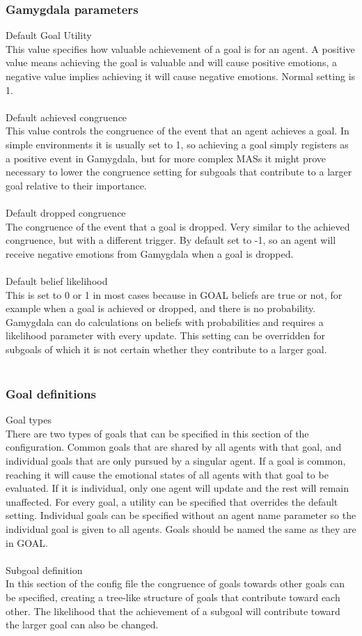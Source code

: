 \documentclass[]{article}
\begin{document}
\subsubsection{Gamygdala parameters}
Default Goal Utility\\
This value specifies how valuable achievement of a goal is for an agent. A positive value means achieving the goal is valuable and will cause positive emotions, a negative value implies achieving it will cause negative emotions. Normal setting is 1.\\
\\
Default achieved congruence\\
This value controls the congruence of the event that an agent achieves a goal. In simple environments it is usually set to 1, so achieving a goal simply registers as a positive event in Gamygdala, but for more complex MASs it might prove necessary to lower the congruence setting for subgoals that contribute to a larger goal relative to their importance.\\
\\
Default dropped congruence\\
The congruence of the event that a goal is dropped. Very similar to the achieved congruence, but with a different trigger. By default set to -1, so an agent will receive negative emotions from Gamygdala when a goal is dropped.\\
\\
Default belief likelihood\\
This is set to 0 or 1 in most cases because in GOAL beliefs are true or not, for example when a goal is achieved or dropped, and there is no probability. Gamygdala can do calculations on beliefs with probabilities and requires a likelihood parameter with every update. This setting can be overridden for subgoals of which it is not certain whether they contribute to a larger goal.\\
\\
\subsubsection{Goal definitions}
Goal types\\
There are two types of goals that can be specified in this section of the configuration. Common goals that are shared by all agents with that goal, and individual goals that are only pursued by a singular agent. If a goal is common, reaching it will cause the emotional states of all agents with that goal to be evaluated. If it is individual, only one agent will update and the rest will remain unaffected. For every goal, a utility can be specified that overrides the default setting. Individual goals can be specified without an agent name parameter so the individual goal is given to all agents. Goals should be named the same as they are in GOAL.\\
\\
Subgoal definition\\
In this section of the config file the congruence of goals towards other goals can be specified, creating a tree-like structure of goals that contribute toward each other. The likelihood that the achievement of a subgoal will contribute toward the larger goal can also be changed.
\end{document}
